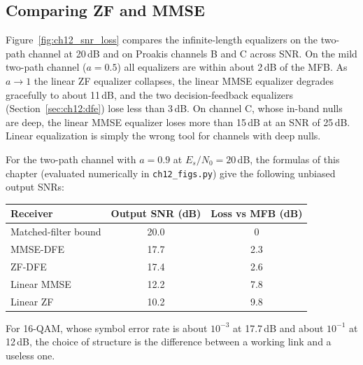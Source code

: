 \subsection{Comparing ZF and MMSE}

Figure~\ref{fig:ch12_snr_loss} compares the infinite-length equalizers on the two-path channel
at 20\,dB and on Proakis channels B and C across SNR. On the mild two-path channel ($a=0.5$) all
equalizers are within about 2\,dB of the MFB. As $a\to1$ the linear ZF equalizer collapses, the
linear MMSE equalizer degrades gracefully to about 11\,dB, and the two decision-feedback equalizers
(Section~\ref{sec:ch12:dfe}) lose less than 3\,dB. On channel C, whose in-band nulls are deep, the
linear MMSE equalizer loses more than 15\,dB at an SNR of 25\,dB. Linear equalization is simply
the wrong tool for channels with deep nulls.


\begin{worked}
For the two-path channel with $a=0.9$ at $E_s/N_0=20$\,dB, the formulas of this chapter
(evaluated numerically in \texttt{ch12\_figs.py}) give the following unbiased output SNRs:
\begin{center}\small
\begin{tabular}{lcc}
\toprule
Receiver & Output SNR (dB) & Loss vs MFB (dB) \\
\midrule
Matched-filter bound & 20.0 & 0 \\
MMSE-DFE & 17.7 & 2.3 \\
ZF-DFE & 17.4 & 2.6 \\
Linear MMSE & 12.2 & 7.8 \\
Linear ZF & 10.2 & 9.8 \\
\bottomrule
\end{tabular}
\end{center}
For 16-QAM, whose symbol error rate is about $10^{-3}$ at 17.7\,dB and about $10^{-1}$ at 12\,dB, the
choice of structure is the difference between a working link and a useless one.
\end{worked}

